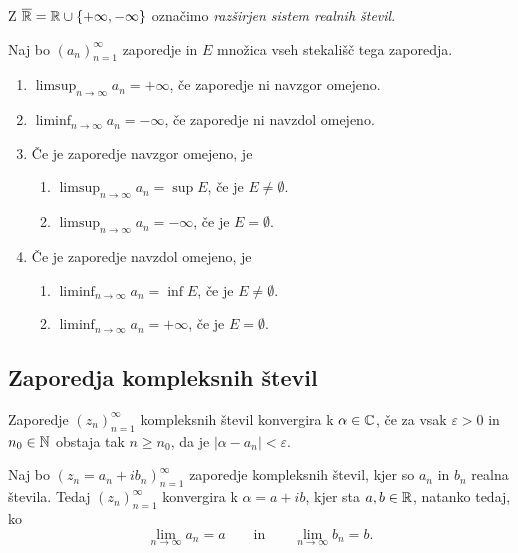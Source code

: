 \documentclass[12pt, a4paper]{article}
\begin{document}
\begin{opomba}
Z $\overline{\mathbb{R}}=\mathbb{R}\cup\left\{+\infty,-\infty\right\}$ označimo \emph{razširjen sistem realnih števil}.
\end{opomba}

\begin{definicija}
Naj bo $(a_n)_{n=1}^\infty$ zaporedje in $E$ množica vseh stekališč tega zaporedja.

\begin{enumerate}[label=\arabic*)]
\item $\displaystyle\limsup_{n\to\infty}a_n=+\infty$, če zaporedje ni navzgor omejeno.
\item $\displaystyle\liminf_{n\to\infty}a_n=-\infty$, če zaporedje ni navzdol omejeno.
\item Če je zaporedje navzgor omejeno, je

\begin{enumerate}[label=(\roman*)]
\item $\displaystyle\limsup_{n\to\infty}a_n=\sup E$, če je $E\ne\emptyset$.
\item $\displaystyle\limsup_{n\to\infty}a_n=-\infty$, če je $E=\emptyset$.
\end{enumerate}

\item Če je zaporedje navzdol omejeno, je

\begin{enumerate}[label=(\roman*)]
\item $\displaystyle\liminf_{n\to\infty}a_n=\inf E$, če je $E\ne\emptyset$.
\item $\displaystyle\liminf_{n\to\infty}a_n=+\infty$, če je $E=\emptyset$.
\end{enumerate}
\end{enumerate}
\end{definicija}

\newpage

\subsection{Zaporedja kompleksnih števil}

\begin{definicija}
Zaporedje $(z_n)_{n=1}^\infty$ kompleksnih števil konvergira k $\alpha\in\mathbb{C}$, če za vsak $\varepsilon>0$ in $n_0\in\mathbb{N}$ obstaja tak $n\geq n_0$, da je $|\alpha-a_n|<\varepsilon$.
\end{definicija}

\begin{izrek}
Naj bo $(z_n=a_n+ib_n)_{n=1}^\infty$ zaporedje kompleksnih števil, kjer so $a_n$ in $b_n$ realna števila. Tedaj $(z_n)_{n=1}^\infty$ konvergira k $\alpha=a+ib$, kjer sta $a,b\in\mathbb{R}$, natanko tedaj, ko
\[
\lim_{n\to\infty}a_n=a\qquad\text{in}\qquad\lim_{n\to\infty}b_n=b.
\]
\end{izrek}
\end{document}
